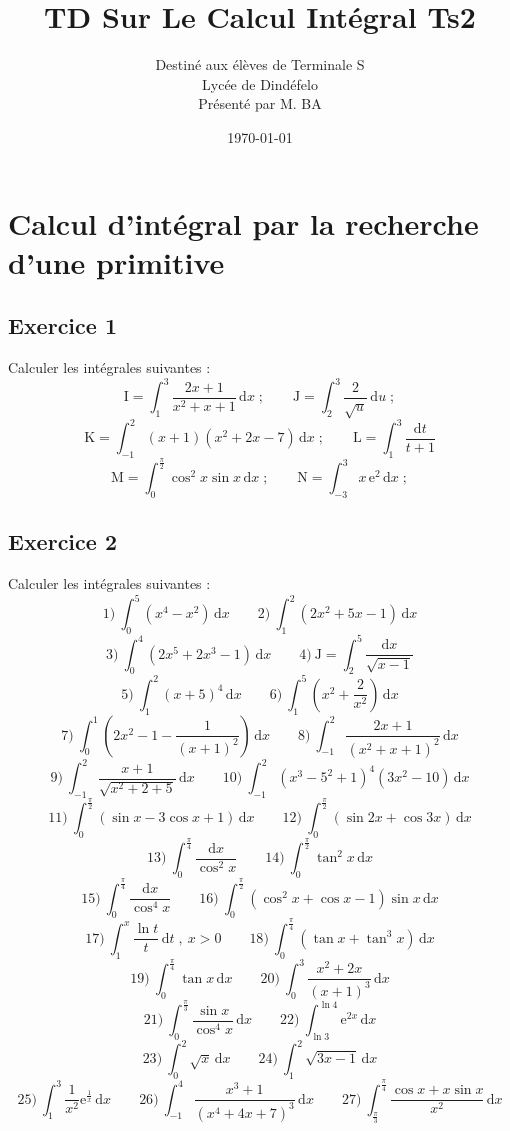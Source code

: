 \documentclass[12pt]{article}
\author{Destiné aux élèves de Terminale S\\Lycée de Dindéfelo\\Présenté par M. BA}
\title{\textbf{TD Sur Le Calcul Intégral Ts2}}
\date{\today}
\begin{document}
\maketitle
\newpage

\section*{Calcul d'intégral par la recherche d'une primitive}

\subsection*{Exercice 1}
Calculer les intégrales suivantes :
\[
\text{I} = \int_{1}^{3}\frac{2x+1}{x^{2}+x+1}\,\mathrm{d}x\;;\qquad \text{J} = \int_{2}^{3}\frac{2}{\sqrt{u}}\,\mathrm{d}u\;;
\]
\[
\text{K} = \int_{-1}^{2}(x+1)(x^{2}+2x-7)\,\mathrm{d}x\;;\qquad \text{L} = \int_{1}^{3}\frac{\mathrm{d}t}{t+1}
\]
\[
\text{M} = \int_{0}^{\frac{\pi}{2}}\cos^{2}x\sin x\,\mathrm{d}x\;;\qquad \text{N} = \int_{-3}^{3}x\,\mathrm{e}^{2}\,\mathrm{d}x\;;
\]

\subsection*{Exercice 2}
Calculer les intégrales suivantes :
\[
1)\ \int_{0}^{5}(x^{4}-x^{2})\,\mathrm{d}x\qquad 2)\ \int_{1}^{2}(2x^{2}+5x-1)\,\mathrm{d}x
\]
\[
3)\ \int_{0}^{4}(2x^{5}+2x^{3}-1)\,\mathrm{d}x\qquad 4)\ \text{J} = \int_{2}^{5}\frac{\mathrm{d}x}{\sqrt{x-1}}
\]
\[
5)\ \int_{1}^{2}(x+5)^{4}\,\mathrm{d}x\qquad 6)\ \int_{1}^{5}\left(x^{2}+\frac{2}{x^{2}}\right)\,\mathrm{d}x
\]
\[
7)\ \int_{0}^{1}\left(2x^{2}-1-\frac{1}{(x+1)^{2}}\right)\,\mathrm{d}x\qquad 8)\ \int_{-1}^{2}\frac{2x+1}{(x^{2}+x+1)^{2}}\,\mathrm{d}x
\]
\[
9)\ \int_{-1}^{2}\frac{x+1}{\sqrt{x^{2}+2+5}}\,\mathrm{d}x\qquad 10)\ \int_{-1}^{2}(x^{3}-5^{2}+1)^{4}(3x^{2}-10)\,\mathrm{d}x
\]
\[
11)\ \int_{0}^{\frac{\pi}{2}}(\sin x-3\cos x+1)\,\mathrm{d}x\qquad 12)\ \int_{0}^{\frac{\pi}{2}}(\sin 2x+\cos 3x)\,\mathrm{d}x
\]
\[
13)\ \int_{0}^{\frac{\pi}{4}}\frac{\mathrm{d}x}{\cos^{2}x}\qquad 14)\ \int_{0}^{\frac{\pi}{2}}\tan^{2}x\,\mathrm{d}x
\]
\[
15)\ \int_{0}^{\frac{\pi}{4}}\frac{\mathrm{d}x}{\cos^{4}x}\qquad 16)\ \int_{0}^{\frac{\pi}{2}}(\cos^{2}x+\cos x-1)\sin x\,\mathrm{d}x
\]
\[
17)\ \int_{1}^{x}\frac{\ln t}{t}\,\mathrm{d}t\;,\ x > 0\qquad 18)\ \int_{0}^{\frac{\pi}{4}}(\tan x+\tan^{3}x)\,\mathrm{d}x
\]
\[
19)\ \int_{0}^{\frac{\pi}{4}}\tan x\,\mathrm{d}x\qquad 20)\ \int_{0}^{3}\frac{x^{2}+2x}{(x+1)^{3}}\,\mathrm{d}x
\]
\[
21)\ \int_{0}^{\frac{\pi}{3}}\frac{\sin x}{\cos^{4}x}\,\mathrm{d}x\qquad 22)\ \int_{\ln 3}^{\ln 4}\mathrm{e}^{2x}\,\mathrm{d}x
\]
\[
23)\ \int_{0}^{2}\sqrt{x}\,\mathrm{d}x\qquad 24)\ \int_{1}^{2}\sqrt{3x-1}\,\mathrm{d}x
\]
\[
25)\ \int_{1}^{3}\frac{1}{x^{2}}\mathrm{e}^{\frac{1}{x}}\,\mathrm{d}x\qquad 26)\ \int_{-1}^{4}\frac{x^{3}+1}{(x^{4}+4x+7)^{3}}\,\mathrm{d}x\qquad 27)\ \int_{\frac{\pi}{3}}^{\frac{\pi}{4}}\frac{\cos x+x\sin x}{x^{2}}\,\mathrm{d}x
\]
\end{document}
